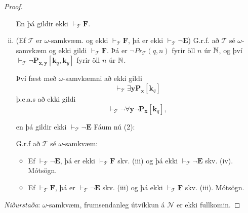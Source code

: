 \documentclass[12pt]{book}
\newcommand{\cT}{\mathcal{T}}
\newcommand{\cN}{\mathcal{N}}
\newcommand{\vT}{\vdash_{\cT}}
\newcommand{\bE}{\mathbf{E}}
\newcommand{\bF}{\mathbf{F}}
\newcommand{\bP}{\mathbf{P}}
\newcommand{\bx}{\mathbf{x}}
\newcommand{\bk}{\mathbf{k}}
\newcommand{\by}{\mathbf{y}}
\begin{document}
\begin{proof}
\begin{enumerate}[(i)]
En þá gildir ekki $\vT \bF$.
\item (Ef $\cT$ er $\omega$-samkvæm. og ekki $\vT \bF$, þá er ekki $\vT \lnot \bE$)
G.r.f. að $\cT$ sé $\omega$-samvkæm og ekki gildi $\vT \bF$.
Þá er $\lnot Pr_{\cT}(q,n)$ fyrir öll $n$ úr $\mathbb{N}$,
og því $\vT \lnot \bP_{\bx,\by}[\bk_q,\bk_y]$ fyrir öll $n$ úr $\mathbb{N}$.

Því fæst með $\omega$-samvkæmni að ekki gildi
\[ \vT \exists \by \bP_{\bx}[\bk_q] \]
þ.e.a.s að ekki gildi 
\[\vT  \lnot \forall \by \lnot \bP_{\bx}[\bk_q], \]

en þá gildir ekki $\vT \lnot \bE$
Fáum nú (2):

G.r.f að $\cT$ sé $\omega$-samkvæm:
\begin{itemize}
\item  Ef $\vT \lnot \bE$, þá er ekki $\vT \bF$ skv. (iii) 
  og þá ekki $\vT \lnot \bE$ skv. (iv). Mótsögn.
\item Ef $\vT \bF$, þá er $\vT \lnot \bE$ skv. (iii) og þá
ekki $\vT \bF$ skv. (iii). Mótsögn.
\end{itemize}
\end{enumerate}

\emph{Niðurstaða}: $\omega$-samkvæm, frumsendanleg útvíkkun á $\cN$ er ekki fullkomin.

\end{proof}
\end{document}
